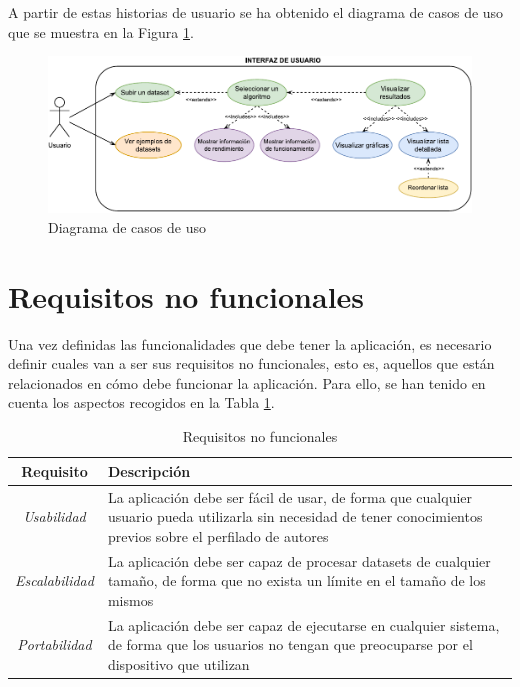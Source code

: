 A partir de estas historias de usuario se ha obtenido el diagrama de casos de uso que se muestra en la Figura
\ref{fig:casos_uso}.

\bigskip
\begin{figure}[H]
	\centering
	\includegraphics[width=\textwidth]{diagramas/usecases.pdf}
	\caption{Diagrama de casos de uso}
	\label{fig:casos_uso}
\end{figure}

\section{Requisitos no funcionales}
\label{sec:analisis_requisitos_no_funcionales}

Una vez definidas las funcionalidades que debe tener la aplicación, es necesario definir cuales van a ser sus requisitos
no funcionales, esto es, aquellos que están relacionados en cómo debe funcionar la aplicación. Para ello, se han tenido
en cuenta los aspectos recogidos en la Tabla \ref{tab:requisitos_no_funcionales}.

\bigskip
\begin{table}[hp!]
  \centering
  \begin{tabular}{c|p{9.6cm}}
		\rowcolor{udcpink!25}
		\textbf{Requisito} & \textbf{Descripción} \\\hline
		\small \textit{Usabilidad} & \small La aplicación debe ser fácil de usar, de forma que cualquier usuario pueda utilizarla sin
		necesidad de tener conocimientos previos sobre el perfilado de autores \\
		\small \textit{Escalabilidad} & \small La aplicación debe ser capaz de procesar datasets de cualquier tamaño, de forma que no
		exista un límite en el tamaño de los mismos \\
		\small \textit{Portabilidad} & \small La aplicación debe ser capaz de ejecutarse en cualquier sistema, de forma que
		los usuarios no tengan que preocuparse por el dispositivo que utilizan \\
  \end{tabular}
  \caption{Requisitos no funcionales}
  \label{tab:requisitos_no_funcionales}
\end{table}
